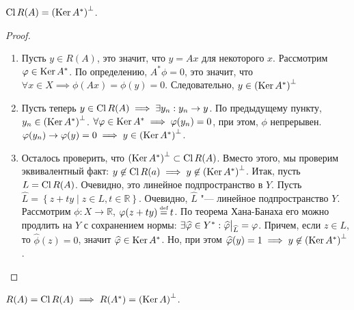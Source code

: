 \begin{theorem}
	$\operatorname{Cl} R(A) = \left( \operatorname{Ker} A^*\right)^\bot$.
\end{theorem}
\begin{proof}\ 
	\begin{enumerate}
		\item
            Пусть $y \in R(A)$, это значит, что $y = Ax$ для некоторого $x$.
            Рассмотрим $\varphi \in \operatorname{Ker} A^*$. По определению, $A^*\phi = 0$, это значит,
            что $\forall x \in X \implies \phi(Ax) = \phi(y) = 0$.
            Следовательно, $y \in \left( \operatorname{Ker} A^*\right)^\bot$
		\item
            Пусть теперь $y \in \operatorname{Cl} R(A) \implies \exists y_n : y_n \rightarrow y$.
            По предыдущему пункту, $y_n \in \left( \operatorname{Ker} A^*\right)^\bot$.
            $\forall \varphi \in \operatorname{Ker} A^* \implies \varphi(y_n) = 0$, при этом, $\phi$ непрерывен.
            $\varphi(y_n) \rightarrow \varphi(y) = 0 \implies y \in \left( \operatorname{Ker} A^*\right)^\bot$.
		\item
            Осталось проверить, что $\left( \operatorname{Ker} A^*\right)^\bot \subset \operatorname{Cl} R(A)$.
            Вместо этого, мы проверим эквивалентный факт:
            $y \not\in \operatorname{Cl} R(a) \implies y \not\in \left( \operatorname{Ker} A^*\right)^\bot$.
            Итак, пусть $L = \operatorname{Cl} R(A)$. Очевидно, это линейное подпространство в $Y$.
            Пусть $\widehat{L} = \left\{ z + ty \mid z \in L, t \in \mathbb{R}\right\}$.
            Очевидно, $\widehat{L}$ "--- линейное подпространство $Y$.
            Рассмотрим $\phi : X \rightarrow \mathbb{R}$, $\phi(z + ty) \defeq t$.
            По теорема Хана-Банаха его можно продлить на $Y$ с сохранением нормы:
            $\exists \widehat{\phi} \in Y^* : \restr{\widehat{\phi}}{\widehat{L}} = \phi$.
            Причем, если $z \in L$, то $\widehat{\phi}(z) = 0$, значит $\widehat{\varphi} \in \operatorname{Ker} A^*$.
            Но, при этом $\widehat{\varphi}(y) = 1 \implies y \not\in \left( \operatorname{Ker} A^*\right)^\bot$. \qedhere
	\end{enumerate}
\end{proof}
\begin{theorem}
	$R(A) = \operatorname{Cl} R(A) \implies R(A^*) = \left( \operatorname{Ker} A\right)^\bot$.
\end{theorem}
